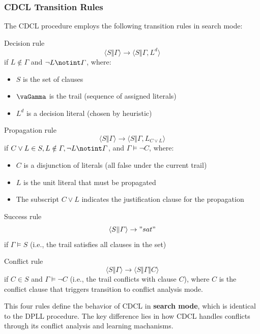 \documentclass[a4paper]{article}
\theoremstyle{definition}
\begin{document}
\subsubsection{CDCL Transition Rules}
The CDCL procedure employs the following transition rules in search mode:
\begin{definition}{Decision rule}
\[
  \langle S \Vert \varGamma \rangle \rightarrow \langle S \Vert \varGamma, L^d \rangle
\]
if \( L \notin \varGamma \) and \( \lnot L \notint \varGamma \), where:
\begin{itemize}
    \item \( S \) is the set of clauses 
    \item \( \vaGamma \) is the trail (sequence of assigned literals)
    \item \( L^d \) is a decision literal (chosen by heuristic)
\end{itemize}
\end{definition}
\begin{definition}{Propagation rule}
\[
  \langle S \Vert \varGamma \rangle \rightarrow \langle S \Vert \varGamma, L_{C \vee L} \rangle 
\]
if \( C \vee L \in S, L \notin \varGamma, \lnot L \notint \varGamma \), and \( \varGamma \models \lnot C \), where:
\begin{itemize}
    \item \( C \) is a disjunction of literals (all false under the current trail)
    \item \( L \) is the unit literal that must be propagated 
    \item The subscript \( C \vee L \) indicates the justification clause for the propagation
\end{itemize}
\end{definition}
\begin{definition}{Success rule}
\[
  \langle S \Vert \varGamma \rangle \rightarrow "sat"
\]
if \( \varGamma \models S \) (i.e., the trail satisfies all clauses in the set)
\end{definition}
\begin{definition}{Conflict rule}
\[
  \langle S \Vert \varGamma \rangle \rightarrow \langle S \Vert \varGamma \Vert C \rangle 
\]  
if \( C \in S \) and \( \varGamma \models \lnot C \) (i.e., the trail conflicts with clause \( C \)), where
\( C \) is the conflict clause that triggers transition to conflict analysis mode.
\end{definition}
This four rules define the behavior of CDCL in \textbf{search mode}, which is identical to the DPLL
procedure. The key difference lies in how CDCL handles conflicts through its conflict analysis 
and learning machanisms.
\end{document}
